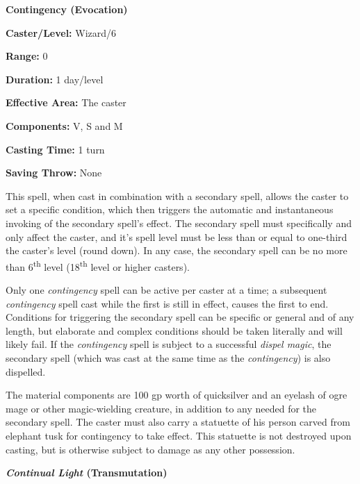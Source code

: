 \begin{multicols}{2}
\begin{minipage}{\columnwidth}
\noindent \textbf{Contingency (Evocation)}

\noindent \textbf{Caster/Level:} Wizard/6

\noindent \textbf{Range:} 0

\noindent \textbf{Duration:} 1 day/level

\noindent \textbf{Effective Area:} The caster

\noindent \textbf{Components:} V, S and M

\noindent \textbf{Casting Time:} 1 turn

\noindent \textbf{Saving Throw:} None

\end{minipage}

This spell, when cast in combination with a secondary spell, allows the caster to set a specific condition, which then triggers the automatic and instantaneous invoking of the secondary spell's effect.  The secondary spell must specifically and only affect the caster, and it's spell level must be less than or equal to one-third the caster's level (round down).  In any case, the secondary spell can be no more than 6\textsuperscript{th} level (18\textsuperscript{th} level or higher casters).

Only one \textit{contingency} spell can be active per caster at a time; a subsequent \textit{contingency} spell cast while the first is still in effect, causes the first to end.  Conditions for triggering the secondary spell can be specific or general and of any length, but elaborate and complex conditions should be taken literally and will likely fail.  If the \textit{contingency} spell is subject to a successful \textit{dispel magic}, the secondary spell (which was cast at the same time as the \textit{contingency}) is also dispelled.

The material components are 100 gp worth of quicksilver and an eyelash of ogre mage or other magic-wielding creature, in addition to any needed for the secondary spell.  The caster must also carry a statuette of his person carved from elephant tusk for contingency to take effect.  This statuette is not destroyed upon casting, but is otherwise subject to damage as any other possession.

\vspace{1em}

\noindent
\begin{minipage}{\columnwidth}

\noindent \textbf{\textit{Continual Light} (Transmutation)}


\end{minipage}
\end{multicols}
